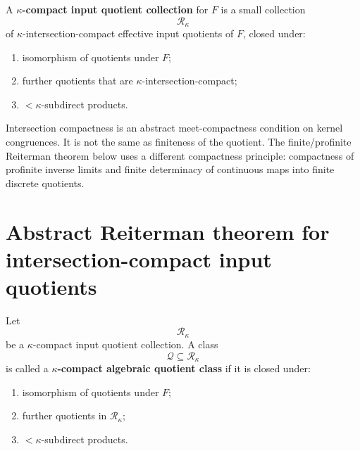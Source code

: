 \begin{definition}
\label{def:eilenberg-kappa-compact-input-quotient-collection}
A \textbf{\(\kappa\)-compact input quotient collection} for \(F\) is a small
collection
\[
\mathcal R_\kappa
\]
of \(\kappa\)-intersection-compact effective input quotients of \(F\), closed
under:
\begin{enumerate}
\item isomorphism of quotients under \(F\);
\item further quotients that are \(\kappa\)-intersection-compact;
\item \(<\kappa\)-subdirect products.
\end{enumerate}
\end{definition}

\begin{remark}
\label{rem:eilenberg-intersection-compactness-versus-finiteness}
Intersection compactness is an abstract meet-compactness condition on kernel
congruences. It is not the same as finiteness of the quotient. The
finite/profinite Reiterman theorem below uses a different compactness
principle: compactness of profinite inverse limits and finite determinacy of
continuous maps into finite discrete quotients.
\end{remark}

\section{Abstract Reiterman theorem for intersection-compact input quotients}
\label{sec:eilenberg-reiterman-intersection-compact}

\begin{definition}
\label{def:eilenberg-kappa-compact-algebraic-quotient-class}
Let
\[
\mathcal R_\kappa
\]
be a \(\kappa\)-compact input quotient collection. A class
\[
\mathcal Q\subseteq\mathcal R_\kappa
\]
is called a \textbf{\(\kappa\)-compact algebraic quotient class} if it is
closed under:
\begin{enumerate}
\item isomorphism of quotients under \(F\);
\item further quotients in \(\mathcal R_\kappa\);
\item \(<\kappa\)-subdirect products.
\end{enumerate}
\end{definition}

